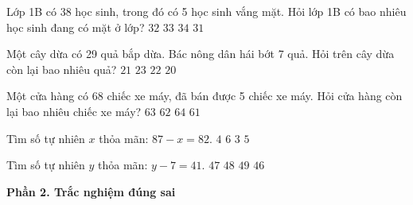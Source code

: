 \begin{ex} %
Lớp 1B có 38 học sinh, trong đó có 5 học sinh vắng mặt. Hỏi lớp 1B có bao nhiêu học sinh đang có mặt ở lớp?
\choice
{$32$}
{\True $33$}
{$34$}
{$31$}
\end{ex}

\begin{ex} %
Một cây dừa có 29 quả bắp dừa. Bác nông dân hái bớt 7 quả. Hỏi trên cây dừa còn lại bao nhiêu quả?
\choice
{$21$}
{$23$}
{\True $22$}
{$20$}
\end{ex}

\begin{ex} %
Một cửa hàng có 68 chiếc xe máy, đã bán được 5 chiếc xe máy. Hỏi cửa hàng còn lại bao nhiêu chiếc xe máy?
\choice
{\True $63$}
{$62$}
{$64$}
{$61$}
\end{ex}

\begin{ex} %
Tìm số tự nhiên $x$ thỏa mãn: $87 - x = 82$.
\choice
{$4$}
{$6$}
{$3$}
{\True $5$}
\end{ex}

\begin{ex} %
Tìm số tự nhiên $y$ thỏa mãn: $y - 7 = 41$.
\choice
{$47$}
{\True $48$}
{$49$}
{$46$}
\end{ex}

\textbf{Phần 2. Trắc nghiệm đúng sai}

